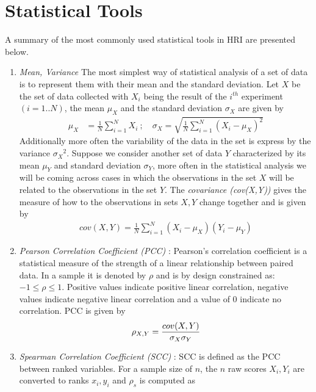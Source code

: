 
\chapter{Statistical Tools} %
\label{AppendixA} %
	A summary of the most commonly used statistical tools in HRI are presented below.
\begin{enumerate}
\item \emph{Mean, Variance} The most simplest way of statistical analysis of a set of data is to represent them with their mean and the standard deviation. Let $X$ be the set of data collected with $X_i$ being the result of the $i^{th}$ experiment $(i = 1..N)$, the mean $\mu_X$ and the standard deviation $\sigma_X$ are given by
\begin{align*}
\mu_X    &= \frac{1}{N} \sum_{i=1}^{N} X_i\ ; \quad \sigma_X = \sqrt{\frac{1}{N} \sum_{i=1}^{N} (X_i - \mu_X)^2}
\end{align*}
Additionally more often the variability of the data in the set is express by the variance ${\sigma_X}^2$. Suppose we consider another set of data $Y$ characterized by its mean $\mu_Y$ and standard deviation $\sigma_Y$, more often in the statistical analysis we will be coming across cases in which the observations in the set $X$ will be related to the observations in the set $Y$. The \emph{covariance (cov(X,Y))} gives the measure of how to the observations in sets $X,Y$ change together and is given by
\begin{align*}
cov(X,Y) = \frac{1}{N} \sum_{i=1}^{N} (X_i - \mu_X) (Y_i - \mu_Y) 
\end{align*}
\item \emph{Pearson Correlation Coefficient (PCC)} : Pearson’s correlation coefficient is a statistical measure of the strength of a linear relationship between paired data. In a sample it is denoted by $\rho$ and is by design constrained as: $-1 \leq \rho \leq 1$. Positive values indicate positive linear correlation, negative values indicate negative linear correlation and a value of 0 indicate no correlation. PCC is given by
\begin{equation}
\rho_{X,Y} = \frac{cov(X,Y)}{\sigma_X\sigma_Y} \\
\end{equation}
\item \emph{Spearman Correlation Coefficient (SCC)} : SCC is defined as the PCC between ranked variables. For a sample size of $n$, the $n$ raw scores $X_i,Y_i$ are converted to ranks $x_i,y_i$ and $\rho_s$ is computed as

\end{enumerate}
